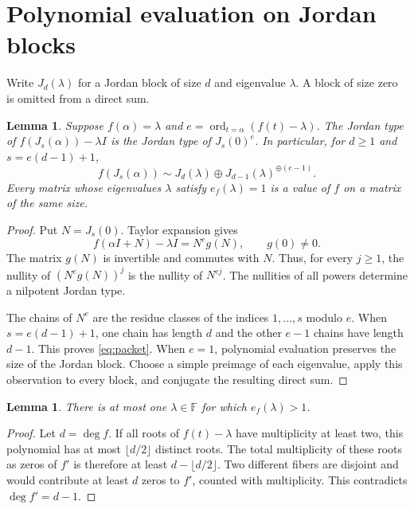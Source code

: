 \documentclass[11pt]{article}
\newtheorem{lemma}[theorem]{Lemma}
\theoremstyle{remark}\newtheorem{remark}[theorem]{Remark}
\newcommand{\F}{\mathbb F}
\begin{document}
\section{Polynomial evaluation on Jordan blocks}
Write $J_d(\lambda)$ for a Jordan block of size $d$ and eigenvalue $\lambda$. A block of size zero is omitted from a direct sum.

\begin{lemma}\label{lem:jordan}
Suppose $f(\alpha)=\lambda$ and $e=\operatorname{ord}_{t=\alpha}(f(t)-\lambda)$. The Jordan type of $f(J_s(\alpha))-\lambda I$ is the Jordan type of $J_s(0)^e$. In particular, for $d\ge1$ and $s=e(d-1)+1$,
\begin{equation}\label{eq:packet}
 f(J_s(\alpha))\sim J_d(\lambda)\oplus
                  J_{d-1}(\lambda)^{\oplus(e-1)}.
\end{equation}
Every matrix whose eigenvalues $\lambda$ satisfy $e_f(\lambda)=1$ is a value of $f$ on a matrix of the same size.
\end{lemma}

\begin{proof}
Put $N=J_s(0)$. Taylor expansion gives
\[
 f(\alpha I+N)-\lambda I=N^e g(N),\qquad g(0)\ne0.
\]
The matrix $g(N)$ is invertible and commutes with $N$. Thus, for every $j\ge1$, the nullity of $(N^e g(N))^j$ is the nullity of $N^{ej}$. The nullities of all powers determine a nilpotent Jordan type.

The chains of $N^e$ are the residue classes of the indices $1,\ldots,s$ modulo $e$. When $s=e(d-1)+1$, one chain has length $d$ and the other $e-1$ chains have length $d-1$. This proves \eqref{eq:packet}. When $e=1$, polynomial evaluation preserves the size of the Jordan block. Choose a simple preimage of each eigenvalue, apply this observation to every block, and conjugate the resulting direct sum.
\end{proof}

\begin{lemma}\label{lem:exception}
There is at most one $\lambda\in\F$ for which $e_f(\lambda)>1$.
\end{lemma}

\begin{proof}
Let $d=\deg f$. If all roots of $f(t)-\lambda$ have multiplicity at least two, this polynomial has at most $\lfloor d/2\rfloor$ distinct roots. The total multiplicity of these roots as zeros of $f'$ is therefore at least $d-\lfloor d/2\rfloor$. Two different fibers are disjoint and would contribute at least $d$ zeros to $f'$, counted with multiplicity. This contradicts $\deg f'=d-1$.
\end{proof}
\end{document}
